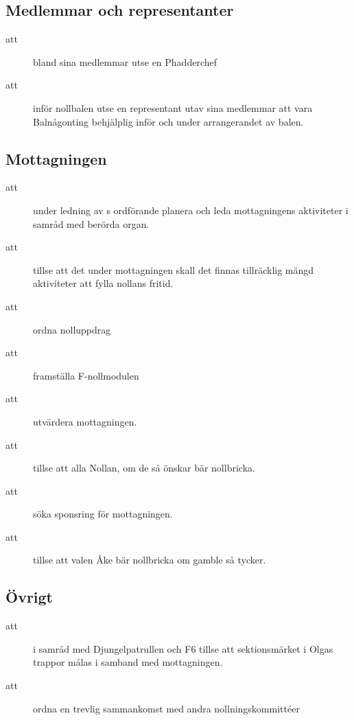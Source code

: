 \subsection{Medlemmar och representanter}
\begin{description}

\item[att] bland sina medlemmar utse en Phadderchef

\item[att] inför nollbalen utse en representant utav sina medlemmar att vara Balnågonting behjälplig inför och under arrangerandet av balen.

\end{description}

\subsection{Mottagningen}
\begin{description}
\item[att] under ledning av \forening s ordförande planera och leda mottagningens aktiviteter i samråd med berörda organ.

\item[att] tillse att det under mottagningen skall det finnas tillräcklig mängd aktiviteter att fylla nollans fritid.

\item[att] ordna nolluppdrag

\item[att] framställa F-nollmodulen

\item[att] utvärdera mottagningen.

\item[att] tillse att alla Nollan, om de
så önskar bär nollbricka.

\item[att] söka sponsring för mottagningen.

\item[att] tillse att valen Åke bär nollbricka om gamble så tycker.

\end{description}

\subsection{Övrigt}
\begin{description}
\item[att] i samråd med Djungelpatrullen och F6 tillse att sektionsmärket i Olgas trappor målas i samband med mottagningen.

\item[att] ordna en trevlig sammankomst med andra nollningskommittéer


\end{description}

